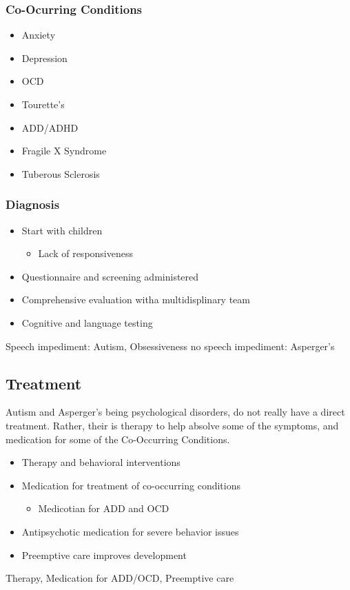 \documentclass[journal, 12pt]{IEEEtran}
\begin{document}
\subsubsection{Co-Ocurring Conditions}
\begin{itemize} 
\item Anxiety 
\item Depression 
\item OCD
\item Tourette's
\item ADD/ADHD
\item Fragile X Syndrome
\item Tuberous Sclerosis
\end{itemize}
\subsubsection{Diagnosis}
\begin{itemize}
\item Start with children
\begin{itemize}
\item Lack of responsiveness
\end{itemize}
\item Questionnaire and screening administered
\item Comprehensive evaluation witha  multidisplinary team 
\item Cognitive and language testing 
\end{itemize}
\begin{IEEEkeywords}
Speech impediment: Autism, Obsessiveness no speech impediment: Asperger's 
\end{IEEEkeywords}
\subsection{Treatment}
Autism and Asperger's being psychological disorders, do not really have a direct treatment. Rather, their is therapy to help absolve some of the symptoms, and medication for some of the Co-Occurring Conditions. 
\begin{itemize}
\item Therapy and behavioral interventions
\item Medication for treatment of co-occurring conditions
\begin{itemize}
\item Medicotian for ADD and OCD
\end{itemize}
\item Antipsychotic medication for severe behavior issues
\item Preemptive care improves development
\end{itemize}
\begin{IEEEkeywords}
Therapy, Medication for ADD/OCD, Preemptive care
\end{IEEEkeywords}
\end{document}

